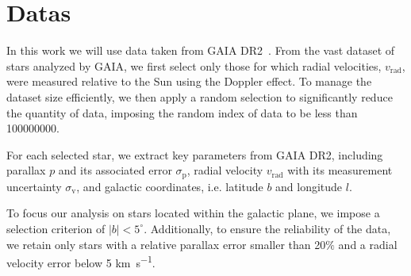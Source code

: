 \section{Datas}

In this work we will use data taken from GAIA DR2~\cite{GAIADR2}. From the vast dataset of stars analyzed by GAIA, we first select only those for which radial velocities, $v_{\text{rad}}$, were measured relative to the Sun using the Doppler effect. To manage the dataset size efficiently, we then apply a random selection to significantly reduce the quantity of data, imposing the random index of data to be less than 100000000. 

For each selected star, we extract key parameters from GAIA DR2, including parallax $p$ and its associated error $\sigma_{\text{p}}$, radial velocity $v_{\text{rad}}$ with its measurement uncertainty $\sigma_{\text{v}}$, and galactic coordinates, i.e. latitude $b$ and longitude $l$.

To focus our analysis on stars located within the galactic plane, we impose a selection criterion of $\vert b \vert < 5^{\circ}$. Additionally, to ensure the reliability of the data, we retain only stars with a relative parallax error smaller than 20$\%$ and a radial velocity error below 5 \unit{\kilo\meter\per\second}.